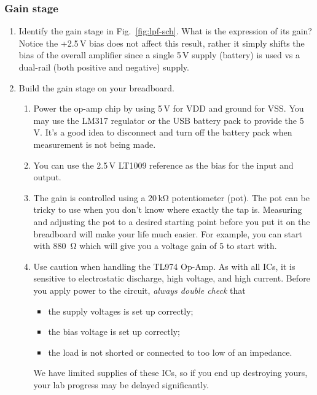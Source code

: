 \documentclass[letterpaper, 11pt]{article}
\begin{document}
\subsubsection{Gain stage}

\begin{enumerate}

	\item Identify the gain stage in Fig.~\ref{fig:lpf-sch}. What is the expression of its gain? Notice the +2.5\,V bias does not affect this result, rather it simply shifts the bias of the overall amplifier since a single 5\,V supply (battery) is used vs a dual-rail (both positive and negative) supply.
	
	\item Build the gain stage on your breadboard. 
		\begin{enumerate}
			\item Power the op-amp chip by using 5\,V for VDD and ground for VSS. You may use the LM317 regulator or the USB battery  pack to provide the 5\,V. It's a good idea to disconnect and turn off the battery pack when measurement is not being made.
			
			\item You can use the 2.5\,V LT1009 reference as the bias for the input and output. 
			
			\item The gain is controlled using a 20\,k\si{\ohm} potentiometer (pot). The pot can be tricky to use when you don't know where exactly the tap is. Measuring and adjusting the pot to a desired starting point before you put it on the breadboard will make your life much easier. For example, you can start with \SI{880}{\ohm} which will give you a voltage gain of 5 to start with. 
			
			\item Use caution when handling the TL974 Op-Amp. As with all ICs, it is sensitive to electrostatic discharge, high voltage, and high current. Before you apply power to the circuit, \textit{always double check} that 
				\begin{itemize}
					\item the supply voltages is set up correctly;
					\item the bias voltage is set up correctly;
					\item the load is not shorted or connected to too low of an impedance.
				\end{itemize}
			We have limited supplies of these ICs, so if you end up destroying yours, your lab progress may be delayed significantly. 
		\end{enumerate}


\end{enumerate}
\end{document}
